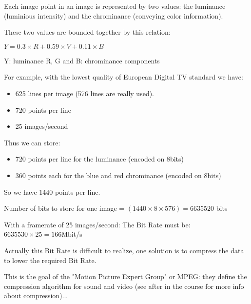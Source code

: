 \documentclass[handout]{beamer}[10pt, usepdftitle=false]
\begin{document}
\begin{frame}
	
	Each image point in an image is represented  by two values: the luminance (luminious intensity) and the chrominance (conveying color information).
	\vspace*{1em}	
	
	
	These two values are bounded together by this relation:
	\vspace*{0.5em}		
	
	$Y=0.3\times R + 0.59\times V + 0.11\times B$
	\vspace*{0.5em}	
	
	Y: luminance
	R, G and B: chrominance components
	\vspace*{0.5em}	
		
		
	For example, with the lowest quality of European Digital TV standard we have:
	\vspace*{0.5em}	
	
	\begin{itemize}
	\item{625 lines per image (576 lines are really used).}
	\item{720 points per line}
	\item{25 images/second}	
	\end{itemize}			
	\vspace*{0.5em}	
		
	\end{frame}
	
	\begin{frame}
	
		
	Thus we can store:	
	\vspace*{1em}	
		
	\begin{itemize}
	\item{720 points per line for the luminance (encoded on 8bits)}
	\item{360 points each for the blue and red chrominance (encoded on 8bits)}
	\end{itemize}	
	\vspace*{0.5em}		
	
	So we have 1440 points per line.
	\vspace*{0.5em}	
	
	Number of bits to store for one image = $(1440\times 8\times 576)	= 6635520$ bits
	\vspace*{0.5em}	
	
	With a framerate of 25 images/second:
	The Bit Rate must be: $6635530\times 25=166$Mbit/s
	\vspace*{0.5em}	
		
	Actually this Bit Rate is difficult to realize, one solution is to compress the data to lower the required Bit Rate.
	\vspace*{0.6em}
	
	This is the goal of the "Motion Picture Expert Group" or MPEG: they define the compression algorithm for sound and video (see after in the course for more info about compression)...		
		
	\end{frame}
	
\end{document}
